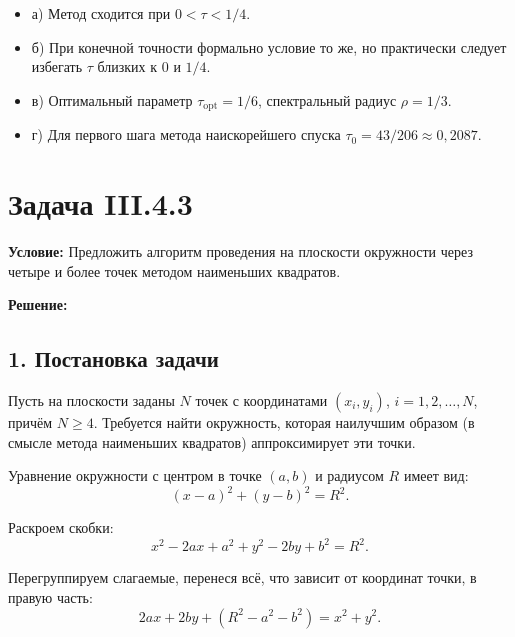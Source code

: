 \documentclass{article}
\begin{document}
\begin{itemize}
\item а) Метод сходится при $0 < \tau < 1/4$.
\item б) При конечной точности формально условие то же, но практически следует избегать $\tau$ близких к 0 и $1/4$.
\item в) Оптимальный параметр $\tau_{\text{opt}} = 1/6$, спектральный радиус $\rho = 1/3$.
\item г) Для первого шага метода наискорейшего спуска $\tau_0 = 43/206 \approx 0,2087$.
\end{itemize}






















\section*{Задача III.4.3}

\textbf{Условие:} Предложить алгоритм проведения на плоскости окружности через четыре и более точек методом наименьших квадратов.

\vspace{0.5cm}
\textbf{Решение:}

\subsection*{1. Постановка задачи}

Пусть на плоскости заданы $N$ точек с координатами $(x_i, y_i)$, $i = 1, 2, \ldots, N$, причём $N \geqslant 4$. Требуется найти окружность, которая наилучшим образом (в смысле метода наименьших квадратов) аппроксимирует эти точки.

Уравнение окружности с центром в точке $(a, b)$ и радиусом $R$ имеет вид:
\begin{equation}
(x - a)^2 + (y - b)^2 = R^2.
\end{equation}

Раскроем скобки:
\begin{equation}
x^2 - 2ax + a^2 + y^2 - 2by + b^2 = R^2.
\end{equation}

Перегруппируем слагаемые, перенеся всё, что зависит от координат точки, в правую часть:
\begin{equation}
2ax + 2by + (R^2 - a^2 - b^2) = x^2 + y^2.
\end{equation}
\end{document}
